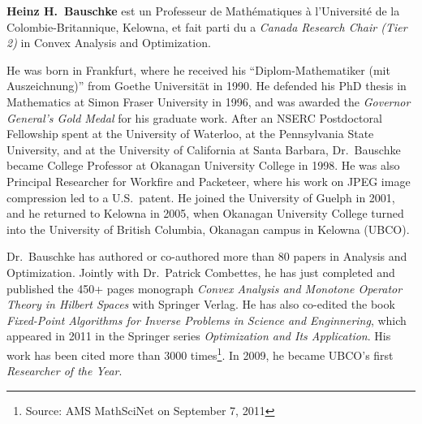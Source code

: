 \documentclass{article}        %
\begin{document}
\textbf{Heinz H.\ Bauschke}
est un Professeur de Mathématiques à l’Université de la Colombie-Britannique, Kelowna, et fait parti du
a \emph{Canada Research Chair (Tier 2)} in
Convex Analysis and Optimization.

He was born in Frankfurt, where
he received his ``Diplom-Mathematiker (mit Auszeichnung)''
from Goethe Universit\"at  in 1990.
He defended his PhD thesis in Mathematics at Simon Fraser University
in 1996, and was awarded the \emph{Governor General's Gold Medal}
for his graduate work.
After an NSERC Postdoctoral Fellowship spent
at the University of Waterloo, at the Pennsylvania State University,
and at the University of California at Santa Barbara,
Dr.~Bauschke
became College Professor at Okanagan University College in 1998.
He was also Principal Researcher for Workfire and Packeteer, where
his work on JPEG image compression led to a U.S.~patent.
He joined the University of Guelph in 2001, and he returned
to Kelowna in 2005, when Okanagan University College turned
into the University of British Columbia, Okanagan campus in Kelowna
(UBCO).

Dr.\ Bauschke has authored or co-authored more than 80 papers in
Analysis and Optimization.
Jointly with Dr.\ Patrick Combettes, he has just completed and
published the 450+ pages monograph \emph{Convex Analysis and Monotone
Operator Theory in Hilbert Spaces} with Springer Verlag.
He has also co-edited the book
\emph{Fixed-Point Algorithms for Inverse Problems in Science
and Enginnering}, which appeared in 2011 in the
Springer series \emph{Optimization and Its Application}.
His work has been cited more than 3000 times\footnote{Source:
AMS MathSciNet on September 7, 2011}.
In 2009, he became UBCO's first \emph{Researcher of the Year}.
\end{document}
